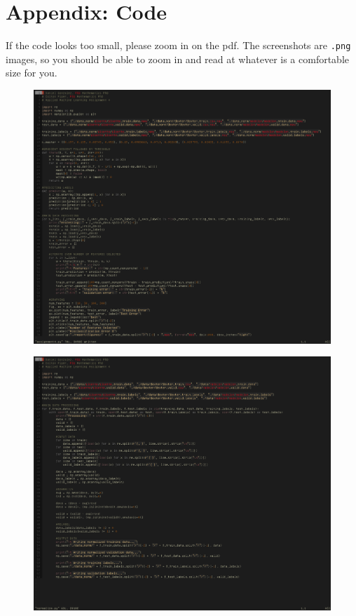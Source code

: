 \documentclass[UTF8]{article}
\begin{document}
\section{Appendix: Code}
If the code looks too small, please zoom in on the pdf.
The screenshots are \texttt{.png} images, so you should be able to zoom in and read at whatever is a comfortable size for you.
\begin{figure}[H]
    \centering
    \includegraphics[scale=0.6]{./figures/code_TISP.png}
\end{figure}
\begin{figure}[H]
    \centering
    \includegraphics[scale=0.6]{./figures/code_normalize.png}
\end{figure}
\end{document}
